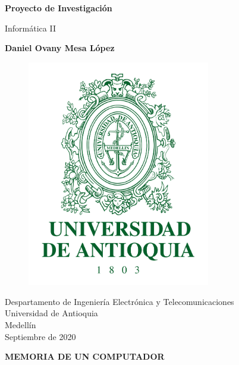 \documentclass{article}
\begin{document}
\begin{titlepage}
    \begin{center}
        \vspace*{0.2cm}
            
        \Huge
        \textbf{Proyecto de Investigación}
            
        \vspace{0.5cm}
        \LARGE
        Informática II
            
        \vspace{1cm}
            
        \textbf{Daniel Ovany Mesa López}
        
        \vfill
        
        \begin{figure}[htp]
            \centering
            \includegraphics[width=8cm]{Images/Escudo_UdeA.png}
        \end{figure}
        
            
        \vspace{0.5cm}
            
        \Large
        Despartamento de Ingeniería Electrónica y Telecomunicaciones\\
        Universidad de Antioquia\\
        Medellín\\
        Septiembre de 2020
            
    \end{center}
\end{titlepage}


\newpage
\begin{center}
    \title{}
    \textbf{MEMORIA DE UN COMPUTADOR}    
\end{center}
\end{document}
